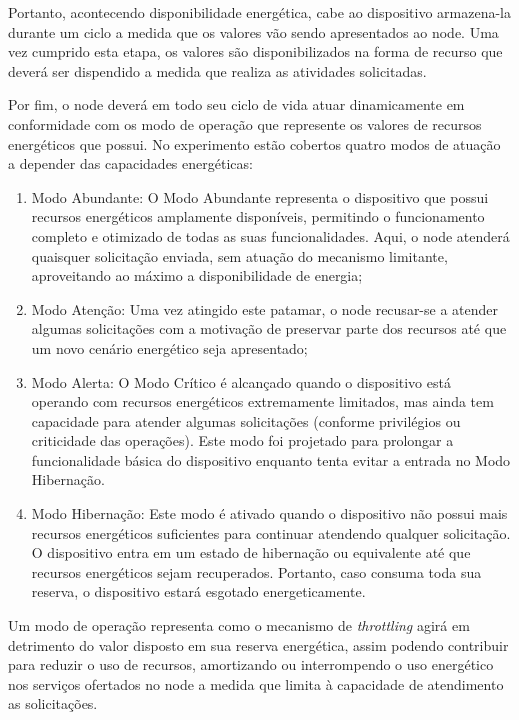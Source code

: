 Portanto, acontecendo disponibilidade energética, cabe ao dispositivo armazena-la durante um ciclo a medida que os valores vão sendo apresentados ao node. Uma vez cumprido esta etapa, os valores são disponibilizados na forma de recurso que deverá ser dispendido a medida que realiza as atividades solicitadas.

Por fim, o node deverá em todo seu ciclo de vida atuar dinamicamente em conformidade com os modo de operação que represente os valores de recursos energéticos que possui. No experimento estão cobertos quatro modos de atuação a depender das capacidades energéticas:

\begin{enumerate}	
\item Modo Abundante: O Modo Abundante representa o dispositivo que possui recursos energéticos amplamente disponíveis, permitindo o funcionamento completo e otimizado de todas as suas funcionalidades. Aqui, o node atenderá quaisquer solicitação enviada, sem atuação do mecanismo limitante, aproveitando ao máximo a disponibilidade de energia;
\item Modo Atenção: Uma vez atingido este patamar, o node recusar-se a atender algumas solicitações com a motivação de preservar parte dos recursos até que um novo cenário energético seja apresentado;
\item Modo Alerta: O Modo Crítico é alcançado quando o dispositivo está operando com recursos energéticos extremamente limitados, mas ainda tem capacidade para atender algumas solicitações (conforme privilégios ou criticidade das operações). Este modo foi projetado para prolongar a funcionalidade básica do dispositivo enquanto tenta evitar a entrada no Modo Hibernação. 
\item Modo Hibernação: Este modo é ativado quando o dispositivo não possui mais recursos energéticos suficientes para continuar atendendo qualquer solicitação. O dispositivo entra em um estado de hibernação ou equivalente até que recursos energéticos sejam recuperados. Portanto, caso consuma toda sua reserva, o dispositivo estará esgotado energeticamente.
\end{enumerate}

Um modo de operação representa como o mecanismo de \textit{throttling} agirá em detrimento do valor disposto em sua reserva energética, assim podendo contribuir para reduzir o uso de recursos, amortizando ou interrompendo o uso energético nos serviços ofertados no node a medida que limita à capacidade de atendimento as solicitações. 

